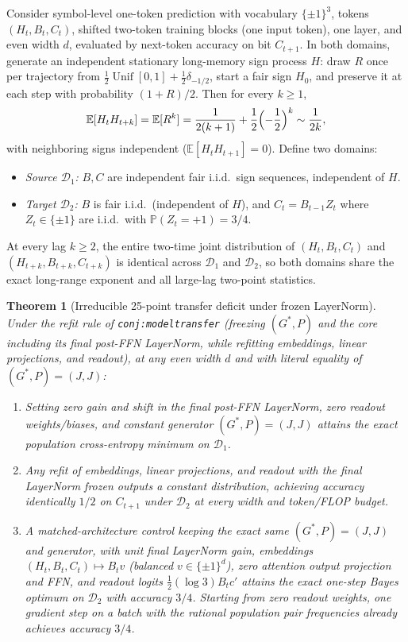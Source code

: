 \documentclass[11pt]{article}
\theoremstyle{plain}
\newtheorem{theorem}{Theorem}
\theoremstyle{definition}
\theoremstyle{remark}
\DeclareMathOperator{\Unif}{Unif}
\begin{document}
Consider symbol-level one-token prediction with vocabulary $\{\pm 1\}^3$, tokens $(H_t, B_t, C_t)$, shifted two-token training blocks (one input token), one layer, and even width $d$, evaluated by next-token accuracy on bit $C_{t+1}$.
In both domains, generate an independent stationary long-memory sign process $H$: draw $R$ once per trajectory from $\tfrac{1}{2}\Unif[0, 1] + \tfrac{1}{2}\delta_{-1/2}$, start a fair sign $H_0$, and preserve it at each step with probability $(1 + R)/2$. Then for every $k \ge 1$,
\[
\mathbb{E}[H_t H_{t+k}] = \mathbb{E}[R^k] = \frac{1}{2(k + 1)} + \frac{1}{2}\Bigl(-\frac{1}{2}\Bigr)^k \sim \frac{1}{2k},
\]
with neighboring signs independent ($\mathbb{E}[H_t H_{t+1}] = 0$).
Define two domains:
\begin{itemize}[leftmargin=2em,itemsep=2pt]
\item \emph{Source $\mathcal{D}_1$:} $B, C$ are independent fair i.i.d.\ sign sequences, independent of $H$.
\item \emph{Target $\mathcal{D}_2$:} $B$ is fair i.i.d.\ (independent of $H$), and $C_t = B_{t-1} Z_t$ where $Z_t \in \{\pm 1\}$ are i.i.d.\ with $\mathbb{P}(Z_t = +1) = 3/4$.
\end{itemize}
At every lag $k \ge 2$, the entire two-time joint distribution of $(H_t, B_t, C_t)$ and $(H_{t+k}, B_{t+k}, C_{t+k})$ is identical across $\mathcal{D}_1$ and $\mathcal{D}_2$, so both domains share the exact long-range exponent and all large-lag two-point statistics.

\begin{theorem}[Irreducible 25-point transfer deficit under frozen LayerNorm]\label{thm:transfer}
Under the refit rule of \texttt{conj:modeltransfer} (freezing $(G^*, P)$ and the core including its final post-FFN LayerNorm, while refitting embeddings, linear projections, and readout), at any even width $d$ and with literal equality of $(G^*, P) = (J, J)$:
\begin{enumerate}[leftmargin=2em,label=\textup{(\arabic*)}]
\item Setting zero gain and shift in the final post-FFN LayerNorm, zero readout weights/biases, and constant generator $(G^*, P) = (J, J)$ attains the exact population cross-entropy minimum on $\mathcal{D}_1$.
\item Any refit of embeddings, linear projections, and readout with the final LayerNorm frozen outputs a constant distribution, achieving accuracy identically $1/2$ on $C_{t+1}$ under $\mathcal{D}_2$ at every width and token/FLOP budget.
\item A matched-architecture control keeping the exact same $(G^*, P) = (J, J)$ and generator, with unit final LayerNorm gain, embeddings $(H_t, B_t, C_t) \mapsto B_t v$ (balanced $v \in \{\pm 1\}^d$), zero attention output projection and FFN, and readout logits $\tfrac{1}{2}(\log 3) B_t c'$ attains the exact one-step Bayes optimum on $\mathcal{D}_2$ with accuracy $3/4$. Starting from zero readout weights, one gradient step on a batch with the rational population pair frequencies already achieves accuracy $3/4$.
\end{enumerate}
\end{theorem}
\end{document}

